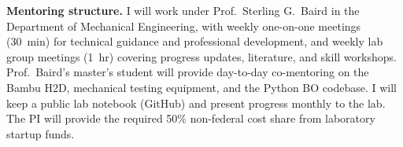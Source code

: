 \documentclass[11pt]{article}
\begin{document}
\textbf{Mentoring structure.} I will work under Prof.~Sterling G.~Baird in the
Department of Mechanical Engineering, with weekly one-on-one meetings
(30~min) for technical guidance and professional development, and weekly lab
group meetings (1~hr) covering progress updates, literature, and skill
workshops.  Prof.~Baird's master's student will provide day-to-day co-mentoring
on the Bambu H2D, mechanical testing equipment, and the Python BO codebase.
I will keep a public lab notebook (GitHub) and present progress monthly to
the lab.  The PI will provide the required 50\% non-federal cost share from
laboratory startup funds.

{\footnotesize
\setlength{\bibsep}{0pt plus 0.3ex}


}
\end{document}
